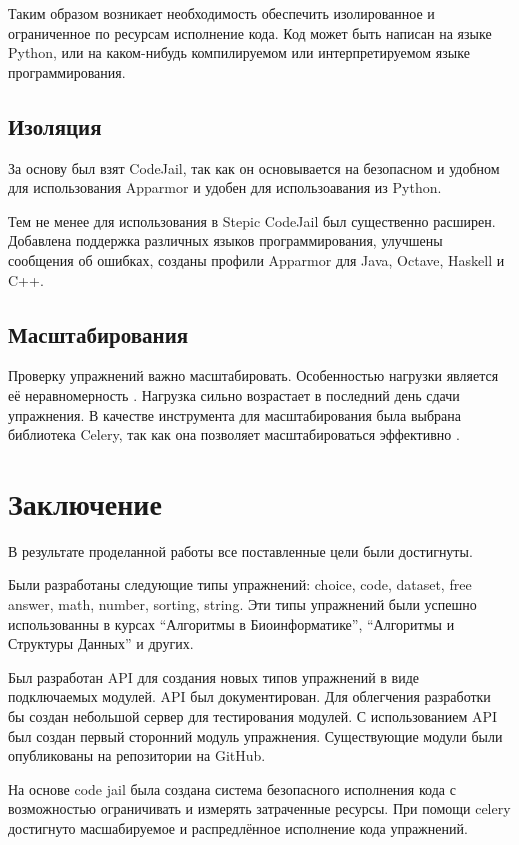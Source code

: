 \documentclass{matmex-diploma-custom}
\begin{document}
Таким образом возникает необходимость обеспечить изолированное
и ограниченное по ресурсам исполнение кода. Код может быть написан на
языке Python, или на каком-нибудь компилируемом или интерпретируемом
языке программирования.

\subsection{Изоляция}
За основу был взят CodeJail, так как он основывается на безопасном и
удобном для использования Apparmor \cite{Bauer} и удобен для
использоавания из Python.

Тем не менее для использования в Stepic CodeJail был существенно
расширен. Добавлена поддержка различных языков программирования,
улучшены сообщения об ошибках, созданы профили Apparmor для Java,
Octave, Haskell и C++.

\subsection{Масштабирования}
Проверку упражнений важно масштабировать. Особенностью нагрузки
является её неравномерность \cite{breslow2013studying}. Нагрузка
сильно возрастает в последний день сдачи упражнения. В качестве
инструмента для масштабирования была выбрана библиотека Celery, так
как она позволяет масштабироваться эффективно \cite{celery}.

\section*{Заключение}
В результате проделанной работы все поставленные цели были
достигнуты.

Были разработаны следующие типы упражнений: choice, code, dataset,
free answer, math, number, sorting, string. Эти типы упражнений были
успешно использованны в курсах ``Алгоритмы в Биоинформатике'',
``Алгоритмы и Структуры Данных'' и других.

Был разработан API для создания новых типов упражнений в виде
подключаемых модулей. API был документирован. Для облегчения
разработки
 бы создан небольшой сервер для тестирования модулей. С
использованием API был создан первый сторонний модуль
упражнения. Существующие модули были опубликованы на репозитории на
GitHub.

На основе code jail была создана система безопасного исполнения кода с
возможностью ограничивать и измерять затраченные ресурсы. При помощи
celery достигнуто масшабируемое и распредлённое исполнение кода упражнений.



\end{document}
